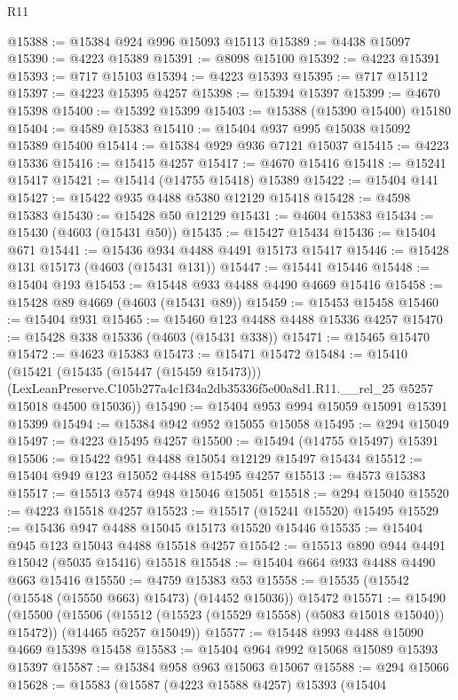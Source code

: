 \begin{lexlean}{R11}
\begin{coremodule}
@15388 := @15384 @924 @996 @15093 @15113
@15389 := @4438 @15097
@15390 := @4223 @15389
@15391 := @8098 @15100
@15392 := @4223 @15391
@15393 := @717 @15103
@15394 := @4223 @15393
@15395 := @717 @15112
@15397 := @4223 @15395 @4257
@15398 := @15394 @15397
@15399 := @4670 @15398
@15400 := @15392 @15399
@15403 := @15388 (@15390 @15400) @15180
@15404 := @4589 @15383
@15410 := @15404 @937 @995 @15038 @15092 @15389 @15400
@15414 := @15384 @929 @936 @7121 @15037
@15415 := @4223 @15336
@15416 := @15415 @4257
@15417 := @4670 @15416
@15418 := @15241 @15417
@15421 := @15414 (@14755 @15418) @15389
@15422 := @15404 @141
@15427 := @15422 @935 @4488 @5380 @12129 @15418
@15428 := @4598 @15383
@15430 := @15428 @50 @12129
@15431 := @4604 @15383
@15434 := @15430 (@4603 (@15431 @50))
@15435 := @15427 @15434
@15436 := @15404 @671
@15441 := @15436 @934 @4488 @4491 @15173 @15417
@15446 := @15428 @131 @15173 (@4603 (@15431 @131))
@15447 := @15441 @15446
@15448 := @15404 @193
@15453 := @15448 @933 @4488 @4490 @4669 @15416
@15458 := @15428 @89 @4669 (@4603 (@15431 @89))
@15459 := @15453 @15458
@15460 := @15404 @931
@15465 := @15460 @123 @4488 @4488 @15336 @4257
@15470 := @15428 @338 @15336 (@4603 (@15431 @338))
@15471 := @15465 @15470
@15472 := @4623 @15383
@15473 := @15471 @15472
@15484 := @15410
    (@15421
      (@15435 (@15447 (@15459 @15473)))
      (LexLeanPreserve.C105b277a4c1f34a2db35336f5e00a8d1.R11.__rel_25 @5257 @15018 @4500 @15036))
@15490 := @15404 @953 @994 @15059 @15091 @15391 @15399
@15494 := @15384 @942 @952 @15055 @15058
@15495 := @294 @15049
@15497 := @4223 @15495 @4257
@15500 := @15494 (@14755 @15497) @15391
@15506 := @15422 @951 @4488 @15054 @12129 @15497 @15434
@15512 := @15404 @949 @123 @15052 @4488 @15495 @4257
@15513 := @4573 @15383
@15517 := @15513 @574 @948 @15046 @15051
@15518 := @294 @15040
@15520 := @4223 @15518 @4257
@15523 := @15517 (@15241 @15520) @15495
@15529 := @15436 @947 @4488 @15045 @15173 @15520 @15446
@15535 := @15404 @945 @123 @15043 @4488 @15518 @4257
@15542 := @15513 @890 @944 @4491 @15042 (@5035 @15416) @15518
@15548 := @15404 @664 @933 @4488 @4490 @663 @15416
@15550 := @4759 @15383 @53
@15558 := @15535 (@15542 (@15548 (@15550 @663) @15473) (@14452 @15036)) @15472
@15571 := @15490
    (@15500
      (@15506 (@15512 (@15523 (@15529 @15558) (@5083 @15018 @15040)) @15472))
      (@14465 @5257 @15049))
@15577 := @15448 @993 @4488 @15090 @4669 @15398 @15458
@15583 := @15404 @964 @992 @15068 @15089 @15393 @15397
@15587 := @15384 @958 @963 @15063 @15067
@15588 := @294 @15066
@15628 := @15583
    (@15587
      (@4223 @15588 @4257)
      @15393
      (@15404

\end{coremodule}
\end{lexlean}

